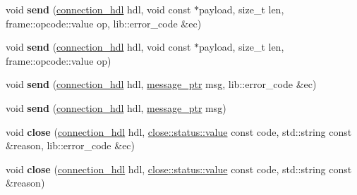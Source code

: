 \begin{DoxyCompactItemize}
\mbox{\label{classwebsocketpp_1_1endpoint_a71e4454af8d8f133ca736e80c3adf268}} 
void {\bfseries send} (\mbox{\hyperlink{namespacewebsocketpp_a6b3d26a10ee7229b84b776786332631d}{connection\+\_\+hdl}} hdl, void const $\ast$payload, size\+\_\+t len, frame\+::opcode\+::value op, lib\+::error\+\_\+code \&ec)
\item 
\mbox{\label{classwebsocketpp_1_1endpoint_adc03a5bd5797a54fde64afd279032671}} 
void {\bfseries send} (\mbox{\hyperlink{namespacewebsocketpp_a6b3d26a10ee7229b84b776786332631d}{connection\+\_\+hdl}} hdl, void const $\ast$payload, size\+\_\+t len, frame\+::opcode\+::value op)
\item 
\mbox{\label{classwebsocketpp_1_1endpoint_a5cad5b7944435e7eec248e98e7e7a912}} 
void {\bfseries send} (\mbox{\hyperlink{namespacewebsocketpp_a6b3d26a10ee7229b84b776786332631d}{connection\+\_\+hdl}} hdl, \mbox{\hyperlink{classwebsocketpp_1_1endpoint_a585ecbbfd9689d4e4229e4c8378bd672}{message\+\_\+ptr}} msg, lib\+::error\+\_\+code \&ec)
\item 
\mbox{\label{classwebsocketpp_1_1endpoint_a702e7d609babdacb8ae772b82c3fa8d0}} 
void {\bfseries send} (\mbox{\hyperlink{namespacewebsocketpp_a6b3d26a10ee7229b84b776786332631d}{connection\+\_\+hdl}} hdl, \mbox{\hyperlink{classwebsocketpp_1_1endpoint_a585ecbbfd9689d4e4229e4c8378bd672}{message\+\_\+ptr}} msg)
\item 
\mbox{\label{classwebsocketpp_1_1endpoint_aa6b81c003dba27c6b30d62d5e79593a6}} 
void {\bfseries close} (\mbox{\hyperlink{namespacewebsocketpp_a6b3d26a10ee7229b84b776786332631d}{connection\+\_\+hdl}} hdl, \mbox{\hyperlink{namespacewebsocketpp_1_1close_1_1status_a8614a5c4733d708e2d2a32191c5bef84}{close\+::status\+::value}} const code, std\+::string const \&reason, lib\+::error\+\_\+code \&ec)
\item 
\mbox{\label{classwebsocketpp_1_1endpoint_a7a4595364dc18d423ff5aa6eda41ecde}} 
void {\bfseries close} (\mbox{\hyperlink{namespacewebsocketpp_a6b3d26a10ee7229b84b776786332631d}{connection\+\_\+hdl}} hdl, \mbox{\hyperlink{namespacewebsocketpp_1_1close_1_1status_a8614a5c4733d708e2d2a32191c5bef84}{close\+::status\+::value}} const code, std\+::string const \&reason)

\end{DoxyCompactItemize}

